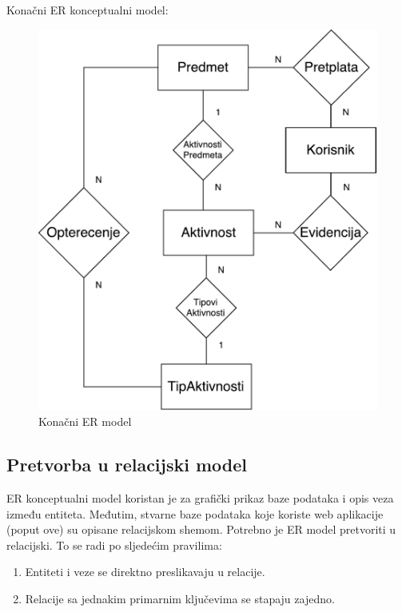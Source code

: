 \documentclass[times, utf8, zavrsni]{fer}
\begin{document}
Konačni ER konceptualni model:

\begin{figure}[H]
\centering
\includegraphics[width=\textwidth,height=\textheight,keepaspectratio]{img/er-model.pdf}
\caption{Konačni ER model}
\label{fig:er-model}
\end{figure}

\subsection{Pretvorba u relacijski model}
ER konceptualni model koristan je za grafički prikaz baze podataka i opis veza između entiteta. Međutim, stvarne baze podataka koje koriste web aplikacije (poput ove) su opisane relacijskom shemom. Potrebno je ER model pretvoriti u relacijski. To se radi po sljedećim pravilima:

\begin{enumerate}
\item Entiteti i veze se direktno preslikavaju u relacije.\\
\item Relacije sa jednakim primarnim ključevima se stapaju zajedno.
\end{enumerate}
\end{document}
